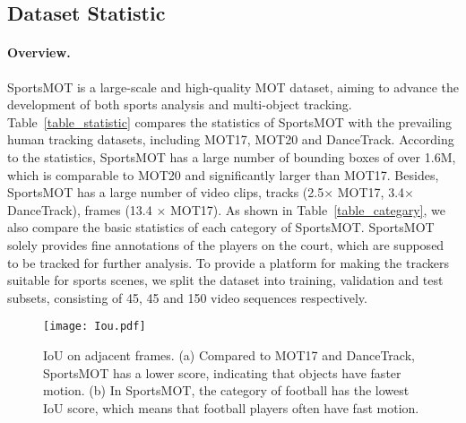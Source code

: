 \documentclass[10pt,twocolumn,letterpaper]{article}
\begin{document}
\subsection{Dataset Statistic}
\label{sec:dataset}
\paragraph{Overview.} 
SportsMOT is a large-scale and high-quality MOT dataset, aiming to advance the development of both sports analysis and multi-object tracking.
Table~\ref{table_statistic} compares the statistics of SportsMOT with the prevailing human tracking datasets, including MOT17, MOT20 and DanceTrack.
According to the statistics, SportsMOT has a large number of bounding boxes of over 1.6M, which is comparable to MOT20 and significantly larger than MOT17.
Besides, SportsMOT has a large number of video clips, tracks (2.5$\times$ MOT17, 3.4$\times$ DanceTrack), frames (13.4 $\times$ MOT17).
As shown in Table~\ref{table_categary}, we also compare the basic statistics of each category of SportsMOT.
SportsMOT solely provides fine annotations of the players on the court, which are supposed to be tracked for further analysis.
To provide a platform for making the trackers suitable for sports scenes, we split the dataset into training, validation and test subsets, consisting of 45, 45 and 150 video sequences respectively.

\begin{figure}[pt]
\centering
\texttt{[image: Iou.pdf]}
\vspace{-8mm}
\caption{IoU on adjacent frames. (a) Compared to MOT17 and DanceTrack, SportsMOT has a lower score, indicating that objects have faster motion. (b) In SportsMOT, the category of football has the lowest IoU score, which means that football players often have fast motion.}
\label{fig:iou}
\end{figure}

\begin{table}[pt]
 \centering
{}
\vspace{-2mm}
\caption{Detailed statistics of the three categories in SportsMOT.}
\vspace{-6mm}
\label{table_categary}
\end{table}
\end{document}
